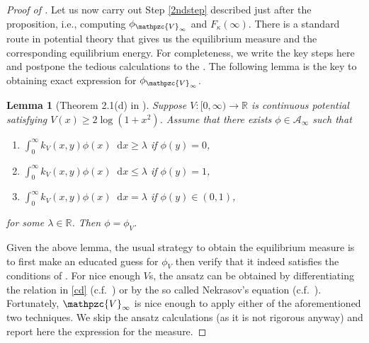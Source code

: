 \documentclass[reqno,11pt]{amsart}
\numberwithin{equation}{section}
\newtheorem{lemma}[proposition]{Lemma}
\theoremstyle{definition}
\newcommand{\R}{\mathbb{R}}
\newcommand*\diff{\mathop{}\!\mathrm{d}}
\begin{document}
\begin{proof}[Proof of ] 
Let us now carry out Step \ref{2ndstep} described just after the proposition, i.e., computing $\phi_{\mathpzc{V}_\infty}$ and $F_\kappa(\infty)$. There is a standard route in potential theory that gives us the equilibrium measure and the corresponding equilibrium energy. For completeness, we write the key steps here and postpone the tedious calculations to the . The following lemma is the key to obtaining exact expression for $\phi_{\mathpzc{V}_\infty}$.

\begin{lemma}[Theorem 2.1(d) in \cite{ds97}] \label{l.ds973} Suppose $V :[0,\infty)\to \R$ is continuous potential satisfying $V(x)\ge 2\log(1+x^2)$. Assume that there exists $\phi\in \mathcal{A}_\infty$ such that
\begin{enumerate}[label=(\alph*),leftmargin=18pt]
    \item $\displaystyle \int_0^\infty k_V(x,y)\phi(x)\diff x \ge \lambda$ if $\phi(y)=0$,
     \item $\displaystyle \int_0^\infty k_V(x,y)\phi(x)\diff x \le \lambda$ if $\phi(y)=1$,
      \item \label{cd} $\displaystyle \int_0^\infty k_V(x,y)\phi(x)\diff x = \lambda$ if $\phi(y) \in (0,1)$,
\end{enumerate}
for some $\lambda\in \R$. Then $\phi=\phi_V$.
\end{lemma}

Given the above lemma, the usual strategy to obtain the equilibrium measure is to first make an educated guess for $\phi_V$ then verify that it indeed satisfies the conditions of . For nice enough $V$s, the ansatz can be obtained by differentiating the relation in \ref{cd} (c.f.~\cite[Section 6]{johansson2000shape}) or by the so called Nekrasov's equation (c.f.~\cite[Section 2]{borodin2017gaussian}). Fortunately, $\mathpzc{V}_\infty$ is nice enough to apply either of the aforementioned two techniques. We skip the ansatz calculations (as it is not rigorous anyway) and report here the expression for the measure.

\medskip


\end{proof}
\end{document}

